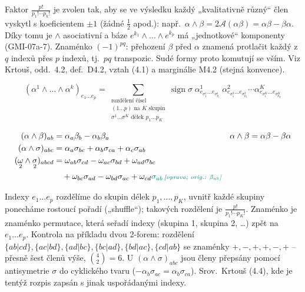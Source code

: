 \begin{vysvetleni}
Faktor $\frac{p!}{p_1!\cdots p_k!}$ je zvolen tak, aby se ve výsledku každý „kvalitativně různý“ člen vyskytl s koeficientem $\pm1$ (žádné $\frac12$ apod.): např.\ $\alpha\wedge\beta=2\mathcal{A}(\alpha\beta)=\alpha\beta-\beta\alpha$. Díky tomu je $\wedge$ asociativní a báze $e^{k_1}\wedge\dots\wedge e^{k_p}$ má „jednotkové“ komponenty (GMI-07a-7).
Znaménko $(-1)^{pq}$: přehození $\beta$ před $\alpha$ znamená protlačit každý z $q$ indexů přes $p$ indexů, tj.\ $pq$ transpozic. Sudé formy proto komutují se vším.
Viz Krtouš, odd.~4.2, def.~D4.2, vztah (4.1) a marginálie M4.2 (stejná konvence).
\end{vysvetleni}

\[
  (\alpha^1\wedge\dots\wedge\alpha^k)_{e_1\dots e_p}
  = \sum_{\substack{\text{rozdělení čísel}\\ (1\dots p)\text{ na }K\text{ skupin}\\ \sigma^1\dots\sigma^K\text{ délek }p_1\dots p_K}}
  \operatorname{sign}\sigma\;
  \alpha^1_{e_{\sigma^1_1}\dots e_{\sigma^1_{p_1}}}\,
  \alpha^2_{e_{\sigma^2_1}\dots e_{\sigma^2_{p_2}}}\cdots
  \alpha^K_{e_{\sigma^K_1}\dots e_{\sigma^K_{p_K}}}
\]

\begin{priklad}[Př.]
\begin{align*}
  (\alpha\wedge\beta)_{ab} &= \alpha_a\beta_b - \alpha_b\beta_a & \alpha\wedge\beta &= \alpha\beta - \beta\alpha \\
  (\alpha\wedge\sigma)_{abc} &= \alpha_a\sigma_{bc} + \alpha_b\sigma_{ca} + \alpha_c\sigma_{ab} \\
  (\underset{2}{\omega}\wedge\underset{2}{\sigma})_{abcd} &= \omega_{ab}\sigma_{cd} - \omega_{ac}\sigma_{bd} + \omega_{ad}\sigma_{bc} \\
  &\quad + \omega_{bc}\sigma_{ad} - \omega_{bd}\sigma_{ac} + \omega_{cd}\oprava{\sigma_{ab}}{\beta_{ab}}
\end{align*}
\end{priklad}

\begin{vysvetleni}
Indexy $e_1\dots e_p$ rozdělíme do skupin délek $p_1,\dots,p_K$, uvnitř každé skupiny ponecháme rostoucí pořadí („shuffle“); takových rozdělení je $\frac{p!}{p_1!\cdots p_K!}$. Znaménko je znaménko permutace, která seřadí indexy (skupina 1, skupina 2, \dots) zpět na $e_1\dots e_p$.
Kontrola na příkladu dvou 2-forem: rozdělení $\{ab|cd\},\{ac|bd\},\{ad|bc\},\{bc|ad\},\{bd|ac\},\{cd|ab\}$ se znaménky $+,-,+,+,-,+$ -- přesně šest členů výše, $\binom42=6$.
U $(\alpha\wedge\sigma)_{abc}$ jsou členy přepsány pomocí antisymetrie $\sigma$ do cyklického tvaru ($-\alpha_b\sigma_{ac}=\alpha_b\sigma_{ca}$). Srov.\ Krtouš (4.4), kde je tentýž rozpis zapsán s jinak uspořádanými indexy.
\end{vysvetleni}

